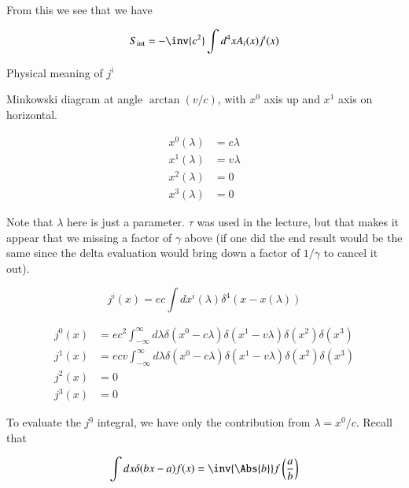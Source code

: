 From this we see that we have

\begin{equation}\label{eqn:relativisticElectrodynamicsL12b:430}
S_{\text{int}} = -\inv{c^2} \int d^4 x A_i(x) j^i(x)
\end{equation}

Physical meaning of \(j^i\)

Minkowski diagram at angle \(\arctan(v/c)\), with \(x^0\) axis up and \(x^1\) axis on horizontal.

\begin{equation}\label{eqn:relativisticElectrodynamicsL12b:450}
\begin{aligned}
x^0(\lambda) &= c \lambda \\
x^1(\lambda) &= v \lambda \\
x^2(\lambda) &= 0 \\
x^3(\lambda) &= 0
\end{aligned}
\end{equation}

Note that \(\lambda\) here is just a parameter.  \(\tau\) was used in the lecture, but that makes it appear that we missing a factor of \(\gamma\) above (if one did the end result would be the same since the delta evaluation would bring down a factor of \(1/\gamma\) to cancel it out).

\begin{equation}\label{eqn:relativisticElectrodynamicsL12b:470}
j^i(x) = e c \int dx^i(\lambda) \delta^4 (x - x(\lambda))
\end{equation}

\begin{equation}\label{eqn:relativisticElectrodynamicsL12b:490}
\begin{aligned}
j^0(x) &= e c^2  \int_{-\infty}^\infty d\lambda \delta(x^0 -  c \lambda) \delta(x^1 -  v \lambda) \delta(x^2) \delta(x^3) \\
j^1(x) &= e c v  \int_{-\infty}^\infty d\lambda \delta(x^0 -  c \lambda) \delta(x^1 -  v \lambda) \delta(x^2) \delta(x^3) \\
j^2(x) &= 0 \\
j^3(x) &= 0
\end{aligned}
\end{equation}

To evaluate the \(j^0\) integral, we have only the contribution from \(\lambda = x^0/ c\).  Recall that

\begin{equation}\label{eqn:relativisticElectrodynamicsL12b:510}
\int dx \delta( b x - a) f(x) = \inv{\Abs{b}} f\left( \frac{a}{b} \right)
\end{equation}

